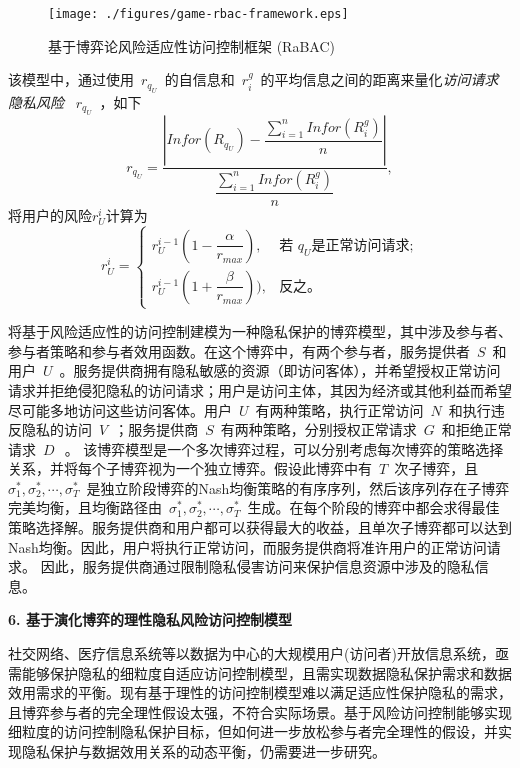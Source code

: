 \documentclass[pdftex,notypeinfo,twoside,openany,UTF8,fntef]{CASthesis}
\theoremstyle{THrm}{
	\newtheorem{question}{Question}[section]
	\newtheorem{property}{性质}[section]
	\newtheorem{assumption}{假设}[section]
	\newtheorem{claim}[lemma]{断言}
	
}
\begin{document}
\begin{figure}[htb]
	\centering
	\texttt{[image: ./figures/game-rbac-framework.eps]}
	\caption{基于博弈论风险适应性访问控制框架 (RaBAC)}\label{fig:game-rbac-framework}
\end{figure}
该模型中，通过使用~$r_{q_U}$~的自信息和~$r^g_i$~的平均信息之间的距离来量化\emph{访问请求隐私风险} ~$r_{q_U}$~，如下
\begin{equation}\label{eq:privacy_risk_qu}
r_{q_U} = \dfrac{|Infor(R_{q_U})-\dfrac{\sum ^{n}_{i=1} Infor(R^g_i)}{n}|}{\dfrac{\sum ^{n}_{i=1} Infor(R^g_i)}{n}},
\end{equation}
将用户的风险$r_U^{i}$计算为
\begin{equation}\label{eq:userrisk}
r_U^{i}=\left\{
\begin{array}{cl}
r_U^{i-1}(1-\dfrac{\alpha}{r_{max}}), & \text{若 } q_U \text{是正常访问请求;}\\
r_U^{i-1}(1+\dfrac{\beta}{r_{max}})), & \text{反之。}
\end{array}
\right.
\end{equation}

将基于风险适应性的访问控制建模为一种隐私保护的博弈模型，其中涉及参与者、参与者策略和参与者效用函数。在这个博弈中，有两个参与者，服务提供者~$S$~和用户~$U$~。服务提供商拥有隐私敏感的资源（即访问客体），并希望授权正常访问请求并拒绝侵犯隐私的访问请求；用户是访问主体，其因为经济或其他利益而希望尽可能多地访问这些访问客体。用户~$U$~有两种策略，执行正常访问~$N$~和执行违反隐私的访问~$V$~；服务提供商~$S$~有两种策略，分别授权正常请求~$G$~和拒绝正常请求~$D~$~。
该博弈模型是一个多次博弈过程，可以分别考虑每次博弈的策略选择关系，并将每个子博弈视为一个独立博弈。假设此博弈中有~$T$~次子博弈，且~$\sigma_1^*, \sigma_2^*, \cdots, \sigma_T^*$~是独立阶段博弈的Nash均衡策略的有序序列，然后该序列存在子博弈完美均衡，且均衡路径由~$\sigma_1^*, \sigma_2^*, \cdots, \sigma_T^*$~生成。在每个阶段的博弈中都会求得最佳策略选择解。服务提供商和用户都可以获得最大的收益，且单次子博弈都可以达到Nash均衡。因此，用户将执行正常访问，而服务提供商将准许用户的正常访问请求。 因此，服务提供商通过限制隐私侵害访问来保护信息资源中涉及的隐私信息。

\textbf{6.	基于演化博弈的理性隐私风险访问控制模型}

社交网络、医疗信息系统等以数据为中心的大规模用户(访问者)开放信息系统，亟需能够保护隐私的细粒度自适应访问控制模型，且需实现数据隐私保护需求和数据效用需求的平衡。现有基于理性的访问控制模型难以满足适应性保护隐私的需求，且博弈参与者的完全理性假设太强，不符合实际场景。基于风险访问控制能够实现细粒度的访问控制隐私保护目标，但如何进一步放松参与者完全理性的假设，并实现隐私保护与数据效用关系的动态平衡，仍需要进一步研究。
\end{document}
